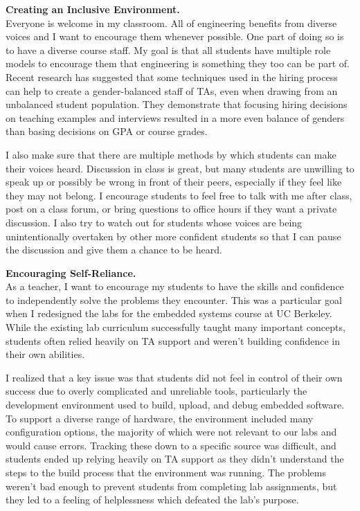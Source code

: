 \documentclass[12pt]{article} %
\begin{document}
\textbf{\textsf{\large Creating an Inclusive Environment.}}\\
Everyone is welcome in my classroom. All of engineering benefits from diverse
voices and I want to encourage them whenever possible. One part of doing so is
to have a diverse course staff. My goal is that all students have multiple role
models to encourage them that engineering is something they too can be part of.
Recent research has suggested that some techniques used in the hiring process
can help to create a gender-balanced staff of TAs, even when drawing from an
unbalanced student population\footnotemark. They demonstrate that focusing
hiring decisions on teaching examples and interviews resulted in a more even
balance of genders than basing decisions on GPA or course grades.


I also make sure that there are multiple methods by which students can make
their voices heard. Discussion in class is great, but many students are
unwilling to speak up or possibly be wrong in front of their peers, especially
if they feel like they may not belong. I encourage students to feel free to
talk with me after class, post on a class forum, or bring questions to office
hours if they want a private discussion. I also try to watch out for students
whose voices are being unintentionally overtaken by other more confident
students so that I can pause the discussion and give them a chance to be heard.

\textbf{\textsf{\large Encouraging Self-Reliance.}}\\
As a teacher, I want to encourage my students to have the skills and confidence
to independently solve the problems they encounter. This was a particular goal
when I redesigned the labs for the embedded systems course at UC Berkeley.
While the existing lab curriculum successfully taught many important concepts,
students often relied heavily on TA support and weren't building confidence in
their own abilities.

I realized that a key issue was that students did not feel in control of their
own success due to overly complicated and unreliable tools, particularly the
development environment used to build, upload, and debug embedded software. To
support a diverse range of hardware, the environment included many
configuration options, the majority of which were not relevant to our labs and
would cause errors. Tracking these down to a specific source was difficult, and
students ended up relying heavily on TA support as they didn't understand the
steps to the build process that the environment was running. The problems
weren't bad enough to prevent students from completing lab assignments, but
they led to a feeling of helplessness which defeated the lab's purpose.
\end{document}

